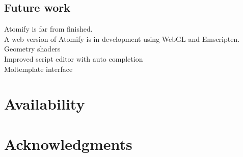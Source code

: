 \documentclass[aps,pre,twocolumn,letterpaper,floatfix]{revtex4}
\begin{document}
\subsection{Future work}
Atomify is far from finished.\\
A web version of Atomify is in development using WebGL and Emscripten. \\
Geometry shaders \\
Improved script editor with auto completion \\
Moltemplate interface \\

\section{Availability}

\section{Acknowledgments}



\end{document}
